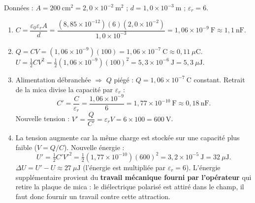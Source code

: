 \documentclass[11pt]{article}
\begin{document}
\begin{corrige}
Données : $A = 200\ \mathrm{cm^2} = 2,0\times10^{-2}\ \mathrm{m^2}$ ; $d = 1,0\times10^{-3}\ \mathrm{m}$ ; $\varepsilon_r = 6$.
\begin{enumerate}
\item $C = \dfrac{\varepsilon_0 \varepsilon_r A}{d} = \dfrac{(8,85\times10^{-12})(6)(2,0\times10^{-2})}{1,0\times10^{-3}} = 1,06\times10^{-9}\ \mathrm{F} \approx 1,1\ \mathrm{nF}$.
\item $Q = CV = (1,06\times10^{-9})(100) = 1,06\times10^{-7}\ \mathrm{C} \approx 0,11\ \mu\mathrm{C}$.\\
$U = \tfrac{1}{2}CV^2 = \tfrac{1}{2}(1,06\times10^{-9})(100)^2 = 5,3\times10^{-6}\ \mathrm{J} = 5,3\ \mu\mathrm{J}$.
\item Alimentation débranchée $\Rightarrow$ $Q$ piégé : $Q = 1,06\times10^{-7}\ \mathrm{C}$ constant. Retrait de la mica divise la capacité par $\varepsilon_r$ :
\[ C' = \frac{C}{\varepsilon_r} = \frac{1,06\times10^{-9}}{6} = 1,77\times10^{-10}\ \mathrm{F} \approx 0,18\ \mathrm{nF}. \]
Nouvelle tension : $V' = \dfrac{Q}{C'} = \varepsilon_r V = 6 \times 100 = 600\ \mathrm{V}$.
\item La tension augmente car la même charge est stockée sur une capacité plus faible ($V = Q/C$). Nouvelle énergie :
\[ U' = \tfrac{1}{2}C'V'^2 = \tfrac{1}{2}(1,77\times10^{-10})(600)^2 = 3,2\times10^{-5}\ \mathrm{J} = 32\ \mu\mathrm{J}. \]
$\Delta U = U' - U \approx 27\ \mu\mathrm{J}$ (l'énergie est multipliée par $\varepsilon_r = 6$). L'énergie supplémentaire provient du \textbf{travail mécanique fourni par l'opérateur} qui retire la plaque de mica : le diélectrique polarisé est attiré dans le champ, il faut donc fournir un travail contre cette attraction.
\end{enumerate}
\end{corrige}
\end{document}
